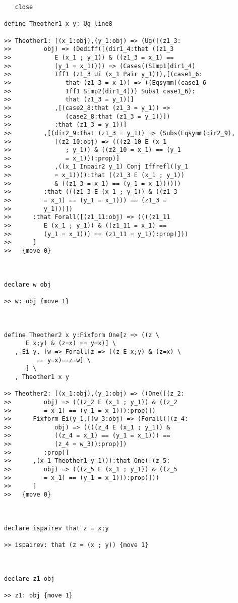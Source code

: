 \documentclass[12pt]{article}
\begin{document}
\begin{verbatim}
   close

define Theother1 x y: Ug line8

>> Theother1: [(x_1:obj),(y_1:obj) => (Ug([(z1_3:
>>         obj) => (Dediff([(dir1_4:that ((z1_3
>>            E (x_1 ; y_1)) & ((z1_3 = x_1) ==
>>            (y_1 = x_1)))) => (Cases((Simp1(dir1_4)
>>            Iff1 (z1_3 Ui (x_1 Pair y_1))),[(case1_6:
>>               that (z1_3 = x_1)) => ((Eqsymm((case1_6
>>               Iff1 Simp2(dir1_4))) Subs1 case1_6):
>>               that (z1_3 = y_1))]
>>            ,[(case2_8:that (z1_3 = y_1)) =>
>>               (case2_8:that (z1_3 = y_1))])
>>            :that (z1_3 = y_1))]
>>         ,[(dir2_9:that (z1_3 = y_1)) => (Subs(Eqsymm(dir2_9),
>>            [(z2_10:obj) => (((z2_10 E (x_1
>>               ; y_1)) & ((z2_10 = x_1) == (y_1
>>               = x_1))):prop)]
>>            ,((x_1 Inpair2 y_1) Conj Iffrefl((y_1
>>            = x_1)))):that ((z1_3 E (x_1 ; y_1))
>>            & ((z1_3 = x_1) == (y_1 = x_1))))])
>>         :that (((z1_3 E (x_1 ; y_1)) & ((z1_3
>>         = x_1) == (y_1 = x_1))) == (z1_3 =
>>         y_1)))])
>>      :that Forall([(z1_11:obj) => ((((z1_11
>>         E (x_1 ; y_1)) & ((z1_11 = x_1) ==
>>         (y_1 = x_1))) == (z1_11 = y_1)):prop)]))
>>      ]
>>   {move 0}



declare w obj

>> w: obj {move 1}



define Theother2 x y:Fixform One[z => ((z \
      E x;y) & (z=x) == y=x)] \
   , Ei y, [w => Forall[z => ((z E x;y) & (z=x) \
         == y=x)==z=w] \
      ] \
   , Theother1 x y

>> Theother2: [(x_1:obj),(y_1:obj) => ((One([(z_2:
>>         obj) => (((z_2 E (x_1 ; y_1)) & ((z_2
>>         = x_1) == (y_1 = x_1))):prop)])
>>      Fixform Ei(y_1,[(w_3:obj) => (Forall([(z_4:
>>            obj) => ((((z_4 E (x_1 ; y_1)) &
>>            ((z_4 = x_1) == (y_1 = x_1))) ==
>>            (z_4 = w_3)):prop)])
>>         :prop)]
>>      ,(x_1 Theother1 y_1))):that One([(z_5:
>>         obj) => (((z_5 E (x_1 ; y_1)) & ((z_5
>>         = x_1) == (y_1 = x_1))):prop)]))
>>      ]
>>   {move 0}



declare ispairev that z = x;y

>> ispairev: that (z = (x ; y)) {move 1}



declare z1 obj

>> z1: obj {move 1}




\end{verbatim}
\end{document}
